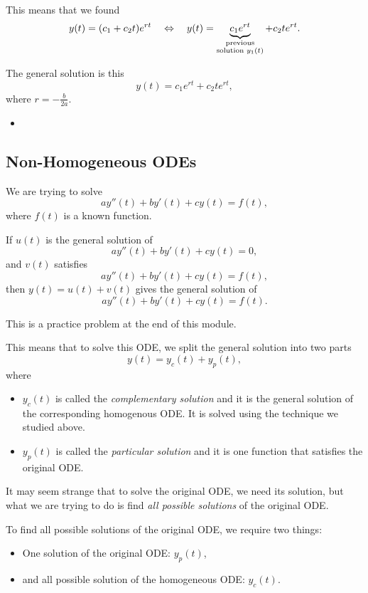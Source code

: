This means that we found 
$$
y(t) = (c_1 + c_2 t) e^{rt}
\quad \Leftrightarrow \quad y(t) = \underbrace{c_1 e^{rt}}_{\substack{\rm previous \\ \text{solution } y_1(t)}} + c_2 t e^{rt}.
$$

The general solution is this
$$
y(t) = c_1 e^{rt} + c_2 t e^{rt},
$$
where $r = -\frac{b}{2a}$.


\begin{video}
\begin{itemize}
	\item {}
\end{itemize}	
\end{video}






\subsection{Non-Homogeneous ODEs}

We are trying to solve
$$
a y''(t)  + b y'(t) + c y(t) = f(t),
$$
where $f(t)$ is a known function. \\


\begin{graybox}
If $u(t)$ is the general solution of
$$
ay''(t)+by'(t)+cy(t) = 0,
$$
and $v(t)$ satisfies
$$
ay''(t)+by'(t)+cy(t) = f(t),
$$
then $y(t) = u(t) + v(t)$ gives the general solution of
$$
ay''(t)+by'(t)+cy(t) = f(t).
$$

This is a practice problem at the end of this module.
\end{graybox}


This means that to solve this ODE, we split the general solution into two parts
$$
y(t) = y_c(t) + y_p(t),
$$
where
\begin{itemize}
	\item $y_c(t)$ is called the \emph{complementary solution} and it is the general solution of the corresponding homogenous ODE. It is solved using the technique we studied above.
	\item $y_p(t)$ is called the \emph{particular solution} and it is one function that satisfies the original ODE.
\end{itemize}

\begin{important}
It may seem strange that to solve the original ODE, we need its solution, but what we are trying to do is find \emph{all possible solutions} of the original ODE.

To find all possible solutions of the original ODE, we require two things:
\begin{itemize}
	\item One solution of the original ODE:  $y_p(t)$,
	\item and all possible solution of the homogeneous ODE: $y_c(t)$.
\end{itemize}
\end{important}


